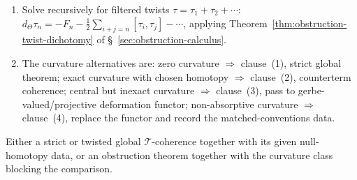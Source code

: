 \begin{description}
\begin{enumerate}
\item Solve recursively for filtered twists
\(\tau=\tau_1+\tau_2+\cdots\):
\(d_\Theta\tau_n=-F_n-\tfrac12\sum_{i+j=n}[\tau_i,\tau_j]-\cdots\),
applying Theorem~\ref{thm:obstruction-twist-dichotomy} of
\S~\ref{sec:obstruction-calculus}.
\item The curvature alternatives are:
zero curvature \(\Rightarrow\) clause~(1), strict global theorem;
exact curvature with chosen homotopy \(\Rightarrow\) clause~(2),
counterterm coherence;
central but inexact curvature \(\Rightarrow\) clause~(3), pass to
gerbe-valued/projective deformation functor;
non-absorptive curvature \(\Rightarrow\) clause~(4), replace the functor
and record the matched-conventions data.
\end{enumerate}
\item[Result.]  Either a strict or twisted global \(\mathcal T\)-coherence
together with its given null-homotopy data, or an obstruction theorem
together with the curvature class blocking the comparison.
\end{description}
